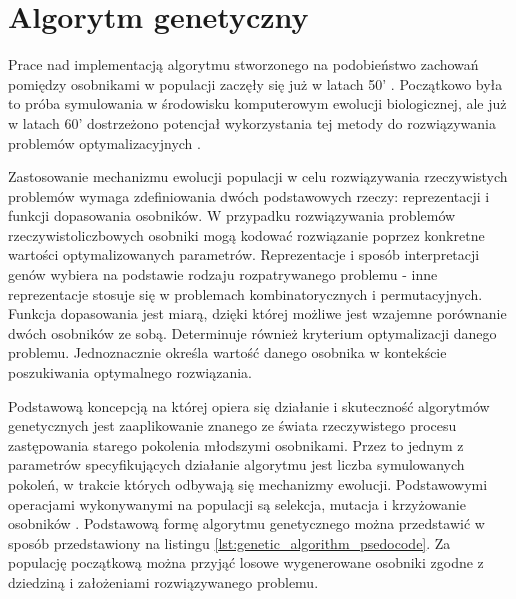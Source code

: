 \section{Algorytm genetyczny}
\par 
Prace nad implementacją algorytmu stworzonego na podobieństwo zachowań pomiędzy osobnikami w populacji zaczęły się już w latach 50' \cite{barker1958simulation}. Początkowo była to próba symulowania w środowisku komputerowym ewolucji biologicznej, ale już w latach 60' dostrzeżono potencjał wykorzystania tej metody do rozwiązywania problemów optymalizacyjnych \cite{bremermann1962optimization}.
\par
Zastosowanie mechanizmu ewolucji populacji w celu rozwiązywania rzeczywistych problemów wymaga zdefiniowania dwóch podstawowych rzeczy: reprezentacji i funkcji dopasowania osobników. W przypadku rozwiązywania problemów rzeczywistoliczbowych osobniki mogą kodować rozwiązanie poprzez konkretne wartości optymalizowanych parametrów. Reprezentacje i sposób interpretacji genów wybiera na podstawie rodzaju rozpatrywanego problemu - inne reprezentacje stosuje się w problemach kombinatorycznych i permutacyjnych. Funkcja dopasowania jest miarą, dzięki której możliwe jest wzajemne porównanie dwóch osobników ze sobą. Determinuje również kryterium optymalizacji danego problemu. Jednoznacznie określa wartość danego osobnika w kontekście poszukiwania optymalnego rozwiązania. 
\par
Podstawową koncepcją na której opiera się działanie i skuteczność algorytmów genetycznych jest zaaplikowanie znanego ze świata rzeczywistego procesu zastępowania starego pokolenia młodszymi osobnikami. Przez to jednym z parametrów specyfikujących działanie algorytmu jest liczba symulowanych pokoleń, w trakcie których odbywają się mechanizmy ewolucji. Podstawowymi operacjami wykonywanymi na populacji są selekcja, mutacja i krzyżowanie osobników \cite{sudholt2008computational}. Podstawową formę algorytmu genetycznego można przedstawić w sposób przedstawiony na listingu \ref{lst:genetic_algorithm_psedocode}. Za populację początkową można przyjąć losowe wygenerowane osobniki zgodne z dziedziną i założeniami rozwiązywanego problemu.
